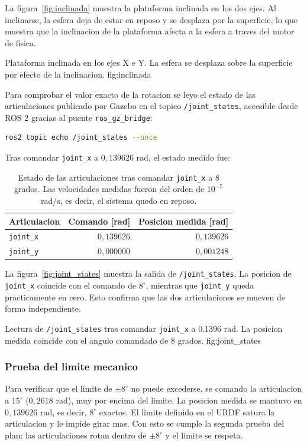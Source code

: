 \documentclass[11pt,a4paper]{article}
\begin{document}
La figura~\ref{fig:inclinada} muestra la plataforma inclinada en los dos ejes. Al inclinarse, la esfera deja de estar en reposo y se desplaza por la superficie, lo que muestra que la inclinacion de la plataforma afecta a la esfera a traves del motor de fisica.

{Plataforma inclinada en los ejes X e Y. La esfera se desplaza sobre la superficie por efecto de la inclinacion.}
{fig:inclinada}

Para comprobar el valor exacto de la rotacion se leyo el estado de las articulaciones publicado por Gazebo en el topico \texttt{/joint\_states}, accesible desde ROS 2 gracias al puente \texttt{ros\_gz\_bridge}:
\begin{lstlisting}[language=bash, caption={Lectura del estado de las articulaciones.}]
ros2 topic echo /joint_states --once
\end{lstlisting}

Tras comandar \texttt{joint\_x} a $0{,}139626$ rad, el estado medido fue:
\begin{table}[H]
    \centering
    \begin{tabular}{@{}lrr@{}}
        \toprule
        \textbf{Articulacion} & \textbf{Comando [rad]} & \textbf{Posicion medida [rad]} \\
        \midrule
        \texttt{joint\_x} & $0{,}139626$ & $0{,}139626$ \\
        \texttt{joint\_y} & $0{,}000000$ & $0{,}001248$ \\
        \bottomrule
    \end{tabular}
    \caption{Estado de las articulaciones tras comandar \texttt{joint\_x} a 8 grados. Las velocidades medidas fueron del orden de $10^{-5}$ rad/s, es decir, el sistema quedo en reposo.}
    \label{tab:joint_8}
\end{table}

La figura~\ref{fig:joint_states} muestra la salida de \texttt{/joint\_states}. La posicion de \texttt{joint\_x} coincide con el comando de $8^\circ$, mientras que \texttt{joint\_y} queda practicamente en cero. Esto confirma que las dos articulaciones se mueven de forma independiente.

{Lectura de \texttt{/joint\_states} tras comandar \texttt{joint\_x} a 0.1396 rad. La posicion medida coincide con el angulo comandado de 8 grados.}
{fig:joint_states}

\subsubsection*{Prueba del limite mecanico}
Para verificar que el limite de $\pm 8^\circ$ no puede excederse, se comando la articulacion a $15^\circ$ ($0{,}2618$ rad), muy por encima del limite. La posicion medida se mantuvo en $0{,}139626$ rad, es decir, $8^\circ$ exactos. El limite definido en el URDF satura la articulacion y le impide girar mas. Con esto se cumple la segunda prueba del plan: las articulaciones rotan dentro de $\pm 8^\circ$ y el limite se respeta.
\end{document}
